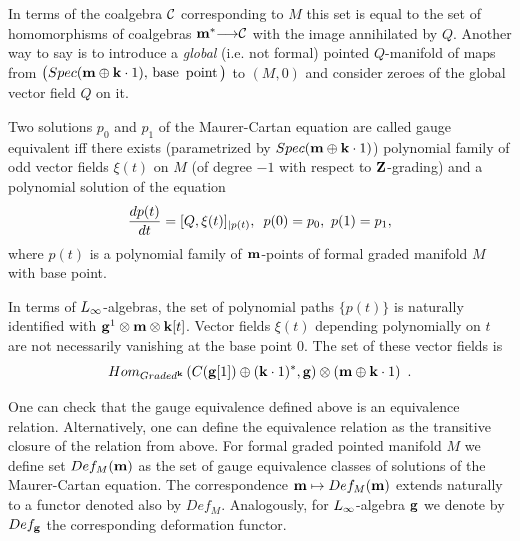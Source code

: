                    In terms of the coalgebra ${\cal C}$ corresponding to $M$ this
                    set is equal to the set of
                     homomorphisms of coalgebras
                     ${\bf m}^*{\longrightarrow} {\cal C}$ with the image annihilated by $Q$. 
                       Another way to say is to introduce a {\it global}
                       (i.e. not formal) pointed $Q$-manifold of maps
                       from $\bigl(
                  Spec({\bf m}\oplus {\bf k}\cdot 1), \,{\rm base\,\,\,point}\,\bigr)$
                   to $(M,0)$ and consider zeroes of the global vector
                    field $Q$ on it.
                  
                  Two  solutions
                   $p_0$ and $p_1$ of the Maurer-Cartan equation 
                   are called gauge equivalent iff there
                   exists (parametrized by $Spec({\bf m}\oplus{\bf k}\cdot 1)$)
                    polynomial family
                    of odd vector fields $\xi(t)$ on $M$ 
                    (of degree $-1$ with respect to 
                    ${\bf Z}$-grading) and a polynomial
                    solution of the equation
                    $${d p(t)\over dt}= [Q,\xi(t)]_{|p(t)},\,\,\,
                    p(0)=p_0,\,\,p(1)=p_1,$$
                    where $p(t)$ is a polynomial family of ${\bf m}$-points
                    of  formal graded manifold $M$ with  base point.
                    
                    
                    In terms of ${L_{\infty}}$-algebras, the set 
                      of polynomial paths  $\{p(t)\}$ is naturally identified
                       with     ${\bf g}^1\otimes {\bf m}\otimes {\bf k}[t]$. Vector fields 
                       $\xi(t)$ depending polynomially on $t$ are not
                       necessarily 
                   vanishing at the base point $0$. 
                   The set of these vector fields
                   is 
                  $$Hom_{Graded^{\bf k}}
                  \left( C({\bf g}[1])\oplus ({\bf k}\cdot 1)^*, {\bf g}\right
                  )\otimes ({\bf m}\oplus{\bf k}\cdot 1)\,\,\,.$$ 
                  
         One can check that the gauge equivalence defined above is
          an equivalence relation. Alternatively, one can define the 
          equivalence relation as the transitive closure of the relation 
          from above.
           For formal graded pointed manifold $M$
           we define  set $Def_M({\bf m})$ as the set of gauge equivalence
           classes of solutions of the Maurer-Cartan equation.
            The correspondence ${\bf m}\mapsto Def_M({\bf m})$ extends naturally
            to a functor denoted also by
            $Def_M$. Analogously, for ${L_{\infty}}$-algebra ${\bf g}$ we denote by
             $Def_{\bf g}$ the corresponding deformation functor.
            
